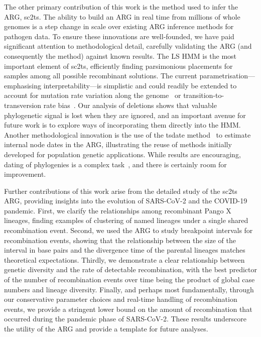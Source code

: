 \documentclass[12pt]{article}
\begin{document}
The other primary contribution of this work is the method used to
infer the ARG, sc2ts.
The ability to build an ARG in real time from millions of whole
genomes is a step change in scale over existing ARG
inference methods for pathogen data\cite{Didelot2010inference,%
Vaughan2017inferring,%
Muller2020bayesian,%
Ignatieva2022,%
Muller2022bayesian}.
To ensure these innovations are well-founded, we have paid significant
attention to methodological detail, carefully validating the ARG
(and consequently the method) against known results.
The LS HMM is the most important element of
sc2ts, efficiently finding parsimonious placements for samples
among all possible recombinant solutions. The current
parametrisation---emphasising interpretability---is simplistic
and could readily be extended to account
for mutation rate variation along the genome~\cite{Haddox2025}
or transition-to-transversion rate bias~\cite{Bloom2023,Simmonds2024}.
Our analysis of deletions shows that valuable phylogenetic signal
is lost when they are ignored, and an important avenue for
future work is to explore ways of incorporating them directly into the HMM.
Another methodological innovation is the use of
the tsdate method~\cite{Wohns2022,Pope2025} to estimate internal node dates
in the ARG, illustrating the reuse of methods initially developed
for population genetic applications. While results are encouraging,
dating of phylogenies is a complex task~\cite{Kumar2016advances},
and there is certainly room for improvement.

Further contributions of this work arise from
the detailed study of the sc2ts ARG,
providing insights into the evolution of SARS-CoV-2
and the COVID-19 pandemic.
First, we clarify the relationships among
recombinant Pango X lineages, finding examples of
clustering of named lineages under a single shared recombination event.
Second, we used the ARG to study breakpoint intervals
for recombination events, showing that the relationship between the
size of the interval in base pairs and the divergence time of the parental lineages matches theoretical expectations.
Thirdly, we demonstrate a clear relationship between
genetic diversity and the rate of detectable recombination,
with the best predictor of the number of recombination
events over time being the product of global case numbers
and lineage diversity.
Finally, and perhaps most fundamentally, through our
conservative parameter choices and real-time handling of
recombination events, we provide a stringent lower
bound on the amount of recombination that occurred during
the pandemic phase of SARS-CoV-2.
These results underscore the utility of the ARG
and provide a template for future analyses.
\end{document}
